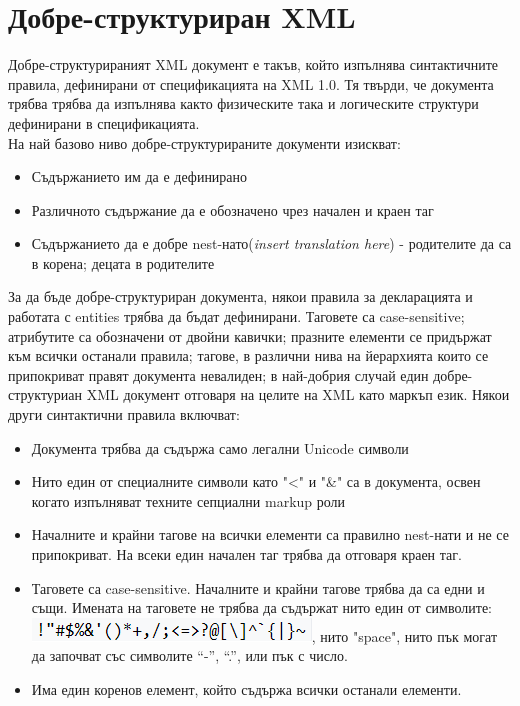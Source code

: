 \documentclass[11pt]{article} %
\begin{document}
\section{Добре-структуриран XML}
Добре-структурираният XML документ е такъв, който изпълнява синтактичните правила, дефинирани от спецификацията на XML 1.0. Тя твърди, че документа трябва трябва да изпълнява както физическите така и логическите структури дефинирани в спецификацията.\\
На най базово ниво добре-структурираните документи изискват:
\begin{itemize}[noitemsep]
	\item Съдържанието им да е дефинирано
	\item Различното съдържание да е обозначено чрез начален и краен таг
	\item Съдържанието да е добре nest-нато(\textit{insert translation here}) - родителите да са в корена; децата в родителите 
\end{itemize}
За да бъде добре-структуриран документа, някои правила за декларацията и работата с entities трябва да бъдат дефинирани. Таговете са case-sensitive; атрибутите са обозначени от двойни кавички; празните елементи се придържат към всички останали правила; тагове, в различни нива на йерархията които се припокриват правят документа невалиден; в най-добрия случай един добре-структуриан XML документ отговаря на целите на XML като маркъп език. Някои други синтактични правила включват:\\
\begin{itemize}[noitemsep]
	\item Документа трябва да съдържа само легални Unicode символи
	\item Нито един от специалните символи като "<" и "\&" са в документа, освен когато изпълняват техните сепциални markup роли
	\item Началните и крайни тагове на всички елементи са правилно nest-нати и не се припокриват. На всеки един начален таг трябва да отговаря краен таг.
	\item Таговете са case-sensitive. Началните и крайни тагове трябва да са едни и същи. Имената на таговете не трябва да съдържат нито един от символите: \includegraphics[scale=0.8]{chars.png}, нито "space", нито пък могат да започват със символите \enquote{-}, \enquote{.}, или пък с число.
	\item Има един коренов елемент, който съдържа всички останали елементи.
\end{itemize}
\end{document}
